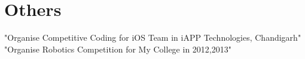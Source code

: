 \documentclass[]{deedy-resume-openfont}
\begin{document}
\begin{minipage}[t]{0.66\textwidth}
\section{Others}
"Organise Competitive Coding for iOS Team in iAPP Technologies, Chandigarh" \\
"Organise Robotics Competition for My College in 2012,2013" \\
\sectionsep



% 
% 

\end{minipage} 
\end{document}
